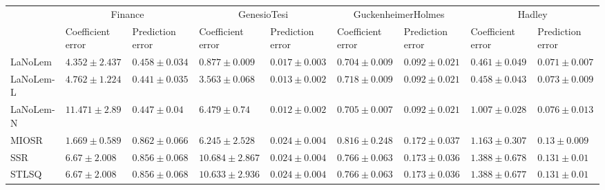 \begin{table*}
{\begin{tabular}{lllllllll}
 & \multicolumn{2}{c}{Finance} & \multicolumn{2}{c}{GenesioTesi} & \multicolumn{2}{c}{GuckenheimerHolmes} & \multicolumn{2}{c}{Hadley} \\
 & Coefficient error & Prediction error & Coefficient error & Prediction error & Coefficient error & Prediction error & Coefficient error & Prediction error \\
\midrule
LaNoLem & $4.352\pm 2.437$ & $0.458\pm 0.034$ & $\mathbf{0.877}\pm 0.009$ & $0.017\pm 0.003$ & $\mathbf{0.704}\pm 0.009$ & $0.092\pm 0.021$ & $0.461\pm 0.049$ & $\mathbf{0.071}\pm 0.007$ \\
LaNoLem-L & $4.762\pm 1.224$ & $\mathbf{0.441}\pm 0.035$ & $3.563\pm 0.068$ & $0.013\pm 0.002$ & $0.718\pm 0.009$ & $\mathbf{0.092}\pm 0.021$ & $\mathbf{0.458}\pm 0.043$ & $0.073\pm 0.009$ \\
LaNoLem-N & $11.471\pm 2.89$ & $0.447\pm 0.04$ & $6.479\pm 0.74$ & $\mathbf{0.012}\pm 0.002$ & $0.705\pm 0.007$ & $0.092\pm 0.021$ & $1.007\pm 0.028$ & $0.076\pm 0.013$ \\
MIOSR & $\mathbf{1.669}\pm 0.589$ & $0.862\pm 0.066$ & $6.245\pm 2.528$ & $0.024\pm 0.004$ & $0.816\pm 0.248$ & $0.172\pm 0.037$ & $1.163\pm 0.307$ & $0.13\pm 0.009$ \\
SSR & $6.67\pm 2.008$ & $0.856\pm 0.068$ & $10.684\pm 2.867$ & $0.024\pm 0.004$ & $0.766\pm 0.063$ & $0.173\pm 0.036$ & $1.388\pm 0.678$ & $0.131\pm 0.01$ \\
STLSQ & $6.67\pm 2.008$ & $0.856\pm 0.068$ & $10.633\pm 2.936$ & $0.024\pm 0.004$ & $0.766\pm 0.063$ & $0.173\pm 0.036$ & $1.388\pm 0.677$ & $0.131\pm 0.01$ \\

\midrule


\end{tabular}}
\end{table*}
